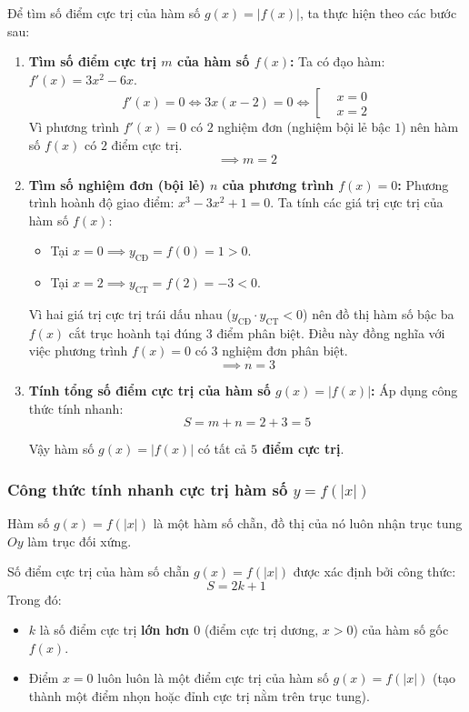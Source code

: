 \documentclass[12pt]{article}
\begin{document}
	\begin{loigiai}
		Để tìm số điểm cực trị của hàm số $g(x) = |f(x)|$, ta thực hiện theo các bước sau:
		
		\begin{enumerate}[label=\textbf{Bước \arabic*:}, leftmargin=*]
			\item \textbf{Tìm số điểm cực trị $m$ của hàm số $f(x)$:}
			Ta có đạo hàm: $f'(x) = 3x^2 - 6x$.
			$$f'(x) = 0 \iff 3x(x - 2) = 0 \iff \left[\begin{aligned} &x = 0 \\ &x = 2 \end{aligned}\right.$$
			Vì phương trình $f'(x) = 0$ có $2$ nghiệm đơn (nghiệm bội lẻ bậc $1$) nên hàm số $f(x)$ có $2$ điểm cực trị.
			$$\implies m = 2$$
			
			\item \textbf{Tìm số nghiệm đơn (bội lẻ) $n$ của phương trình $f(x) = 0$:}
			Phương trình hoành độ giao điểm: $x^3 - 3x^2 + 1 = 0$.
			Ta tính các giá trị cực trị của hàm số $f(x)$:
			\begin{itemize}
				\item Tại $x = 0 \implies y_{\text{CĐ}} = f(0) = 1 > 0$.
				\item Tại $x = 2 \implies y_{\text{CT}} = f(2) = -3 < 0$.
			\end{itemize}
			Vì hai giá trị cực trị trái dấu nhau ($y_{\text{CĐ}} \cdot y_{\text{CT}} < 0$) nên đồ thị hàm số bậc ba $f(x)$ cắt trục hoành tại đúng $3$ điểm phân biệt. Điều này đồng nghĩa với việc phương trình $f(x) = 0$ có $3$ nghiệm đơn phân biệt.
			$$\implies n = 3$$
			
			\item \textbf{Tính tổng số điểm cực trị của hàm số $g(x) = |f(x)|$:}
			Áp dụng công thức tính nhanh:
			$$S = m + n = 2 + 3 = 5$$
			
			Vậy hàm số $g(x) = |f(x)|$ có tất cả \textbf{$5$ điểm cực trị}.
		\end{enumerate}
	\end{loigiai}
	
	\subsubsection{Công thức tính nhanh cực trị hàm số $y = f(|x|)$}
	Hàm số $g(x) = f(|x|)$ là một hàm số chẵn, đồ thị của nó luôn nhận trục tung $Oy$ làm trục đối xứng. 
	
	\begin{tcolorbox}[colback=blue!5!white, colframe=blue!60!black, title=Công thức đếm nhanh cực trị]
		Số điểm cực trị của hàm số chẵn $g(x) = f(|x|)$ được xác định bởi công thức:
		$$S = 2k + 1$$
		Trong đó:
		\begin{itemize}
			\item $k$ là số điểm cực trị \textbf{lớn hơn $0$} (điểm cực trị dương, $x > 0$) của hàm số gốc $f(x)$.
			\item Điểm $x = 0$ luôn luôn là một điểm cực trị của hàm số $g(x) = f(|x|)$ (tạo thành một điểm nhọn hoặc đỉnh cực trị nằm trên trục tung).
		\end{itemize}
	\end{tcolorbox}
	
\end{document}
